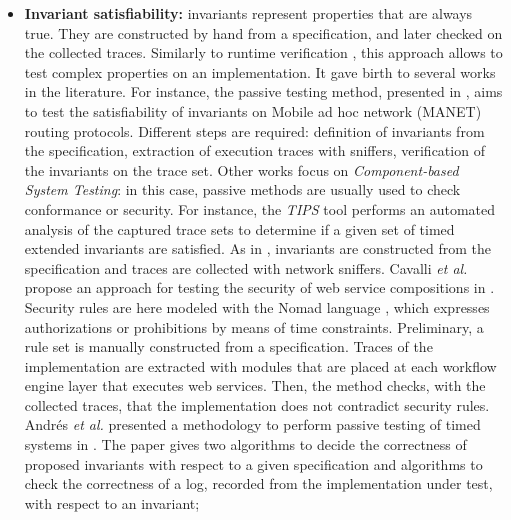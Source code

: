 \begin{itemize}

    \item \textbf{Invariant satisfiability:} invariants represent
        properties that are always true. They are constructed by
        hand from a specification, and later checked on the
        collected traces. Similarly to runtime verification
        \cite{Leucker2009293}, this approach allows to test
        complex properties on an implementation. It gave birth to
        several works in the literature. For instance, the
        passive testing method, presented in \cite{CMdO09}, aims
        to test the satisfiability of invariants on Mobile ad hoc
        network (MANET) routing protocols.  Different steps are
        required: definition of invariants from the
        specification, extraction of execution traces with
        sniffers, verification of the invariants on the trace
        set. Other works focus on \emph{Component-based System
        Testing}: in this case, passive methods are usually used
        to check conformance or security. For instance, the
        \textit{TIPS} tool \cite{5552735} performs an automated
        analysis of the captured trace sets to determine if a
        given set of timed extended invariants are satisfied. As
        in \cite{CMdO09}, invariants are constructed from the
        specification and traces are collected with network
        sniffers. Cavalli \emph{et al.} propose an approach for
        testing the security of web service compositions in
        \cite{cavalli2009passive}. Security rules are here
        modeled with the Nomad language \cite{cuppens2005nomad},
        which expresses authorizations or prohibitions by means
        of time constraints. Preliminary, a rule set is manually
        constructed from a specification. Traces of the
        implementation are extracted with modules that are placed
        at each workflow engine layer that executes web services.
        Then, the method checks, with the collected traces, that
        the implementation does not contradict security rules.
        Andrés \emph{et al.} presented a methodology to perform
        passive testing of timed systems in
        \cite{andres2012formal}. The paper gives two algorithms
        to decide the correctness of proposed invariants with
        respect to a given specification and algorithms to check
        the correctness of a log, recorded from the
        implementation under test, with respect to an invariant;


\end{itemize}
